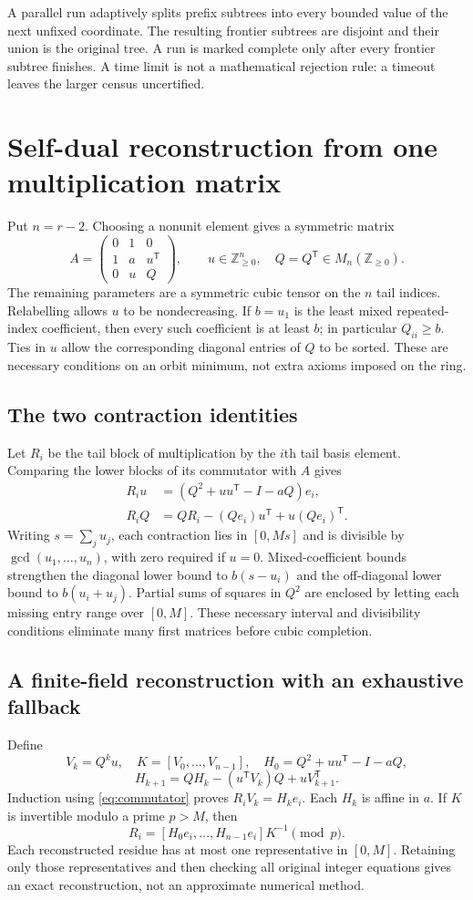 \documentclass[11pt,a4paper]{article}
\theoremstyle{definition}\newtheorem{definition}[theorem]{Definition}\newtheorem{remark}[theorem]{Remark}
\newcommand{\NN}{\mathbb Z_{\geq0}}\newcommand{\FPdim}{\operatorname{FPdim}}
\begin{document}
A parallel run adaptively splits prefix subtrees into every bounded value of
the next unfixed coordinate. The resulting frontier subtrees are disjoint and
their union is the original tree. A run is marked complete only after every
frontier subtree finishes. A time limit is not a
mathematical rejection rule: a timeout leaves the larger census uncertified.

\section{Self-dual reconstruction from one multiplication matrix}
Put $n=r-2$. Choosing a nonunit element gives a symmetric matrix
\[
 A=\begin{pmatrix}0&1&0\\1&a&u^{\mathsf T}\\0&u&Q\end{pmatrix},
 \qquad u\in\NN^n,\quad Q=Q^{\mathsf T}\in M_n(\NN).
\]
The remaining parameters are a symmetric cubic tensor on the $n$ tail indices.
Relabelling allows $u$ to be nondecreasing. If $b=u_1$ is the least mixed
repeated-index coefficient, then every such coefficient is at least $b$;
in particular $Q_{ii}\geq b$. Ties in $u$ allow the corresponding diagonal
entries of $Q$ to be sorted. These are necessary conditions on an orbit minimum,
not extra axioms imposed on the ring.

\subsection{The two contraction identities}
Let $R_i$ be the tail block of multiplication by the $i$th tail basis element.
Comparing the lower blocks of its commutator with $A$ gives
\begin{align}
 R_i u&=(Q^2+uu^{\mathsf T}-I-aQ)e_i,\\
 R_iQ&=QR_i-(Qe_i)u^{\mathsf T}+u(Qe_i)^{\mathsf T}.
 \label{eq:commutator}
\end{align}
Writing $s=\sum_j u_j$, each contraction lies in $[0,Ms]$ and is divisible
by $\gcd(u_1,\ldots,u_n)$, with zero required if $u=0$. Mixed-coefficient
bounds strengthen the diagonal lower bound to $b(s-u_i)$ and the off-diagonal
lower bound to $b(u_i+u_j)$. Partial sums of squares in $Q^2$ are enclosed by
letting each missing entry range over $[0,M]$. These necessary interval and
divisibility conditions eliminate many first matrices before cubic completion.

\subsection{A finite-field reconstruction with an exhaustive fallback}
Define
\[
 V_k=Q^ku,\quad K=[V_0,\ldots,V_{n-1}],\quad
 H_0=Q^2+uu^{\mathsf T}-I-aQ,
\]
\[
 H_{k+1}=QH_k-(u^{\mathsf T}V_k)Q+uV_{k+1}^{\mathsf T}.
\]
Induction using \eqref{eq:commutator} proves $R_iV_k=H_ke_i$.
Each $H_k$ is affine in $a$. If $K$ is invertible modulo a prime $p>M$, then
\[
 R_i=[H_0e_i,\ldots,H_{n-1}e_i]K^{-1}\pmod p.
\]
Each reconstructed residue has at most one representative in $[0,M]$.
Retaining only those representatives and then checking all original integer
equations gives an exact reconstruction, not an approximate numerical method.
\end{document}
